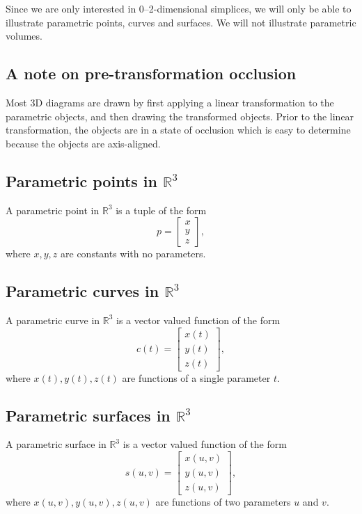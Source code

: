Since we are only interested in 0--2-dimensional simplices, we will
only be able to illustrate parametric points, curves and surfaces. 
We will not illustrate parametric volumes.

\subsection{A note on pre-transformation occlusion}

Most 3D diagrams are drawn by first applying a linear transformation to the
parametric objects, and then drawing the transformed objects. 
Prior to the linear transformation, the objects are in a state of occlusion 
which is easy to determine because the objects are axis-aligned.

\subsection{Parametric points in \texorpdfstring{\(\mathbb{R}^{3}\)}{R3}}

A parametric point in \(\mathbb{R}^{3}\) is a tuple of the form
\[
    p=\begin{bmatrix}
        x \\ y \\ z
    \end{bmatrix},
\]
where \(x,y,z\) are constants with no parameters.

\subsection{Parametric curves in \texorpdfstring{\(\mathbb{R}^{3}\)}{R3}}

A parametric curve in \(\mathbb{R}^{3}\) is a vector valued function of the form
\[
    c(t)=\begin{bmatrix}
        x(t) \\ y(t) \\ z(t)
    \end{bmatrix},
\]
where \(x(t),y(t),z(t)\) are functions of a single parameter \(t\).

\subsection{Parametric surfaces in \texorpdfstring{\(\mathbb{R}^{3}\)}{R3}}

A parametric surface in \(\mathbb{R}^{3}\) is a vector valued function of the form
\[
    s(u,v)=\begin{bmatrix}
        x(u,v) \\ y(u,v) \\ z(u,v)
    \end{bmatrix},
\]
where \(x(u,v),y(u,v),z(u,v)\) are functions of two parameters \(u\) and \(v\).

